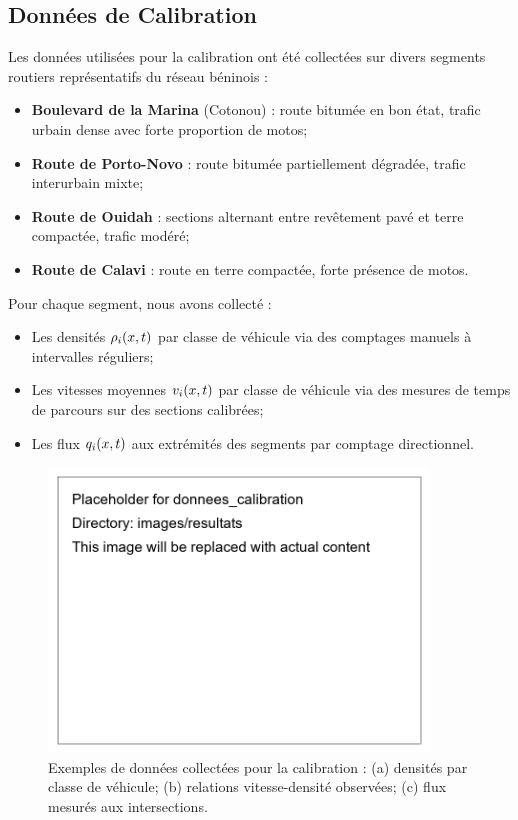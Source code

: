 \subsection{Données de Calibration}
\label{subsec:donnees_calibration}

Les données utilisées pour la calibration ont été collectées sur divers segments routiers représentatifs du réseau béninois :

\begin{itemize}
\item \textbf{Boulevard de la Marina} (Cotonou) : route bitumée en bon état, trafic urbain dense avec forte proportion de motos;
\item \textbf{Route de Porto-Novo} : route bitumée partiellement dégradée, trafic interurbain mixte;
\item \textbf{Route de Ouidah} : sections alternant entre revêtement pavé et terre compactée, trafic modéré;
\item \textbf{Route de Calavi} : route en terre compactée, forte présence de motos.
\end{itemize}

Pour chaque segment, nous avons collecté :
\begin{itemize}
\item Les densités $\rho_{i}(x,t)$ par classe de véhicule via des comptages manuels à intervalles réguliers;
\item Les vitesses moyennes $v_{i}(x,t)$ par classe de véhicule via des mesures de temps de parcours sur des sections calibrées;
\item Les flux $q_{i}(x,t)$ aux extrémités des segments par comptage directionnel.
\end{itemize}

\begin{figure}[htbp]
\centering
\includegraphics[width=0.9\textwidth]{images/resultats/donnees_calibration}
\caption{Exemples de données collectées pour la calibration : (a) densités par classe de véhicule; (b) relations vitesse-densité observées; (c) flux mesurés aux intersections.}
\label{fig:donnees_calibration}
\end{figure}

